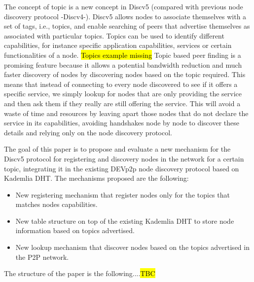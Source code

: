 The concept of topic is a new concept in Discv5 (compared with previous node discovery protocol -Discv4-).
Discv5 allows nodes to associate themselves with a set of tags, i.e., topics, and enable searching of peers that advertise themselves as associated with particular topics.  
Topics can be used to identify different  capabilities, for instance specific application capabilities,  services or certain functionalities of a node. 
\hl{Topics example missing}
Topic based peer finding is a promising feature because it allows a potential bandwidth reduction and much faster discovery of nodes
by  discovering nodes based on the topic required.
This means that instead of connecting to every node discovered to see if it offers a specific service,  we simply lookup for nodes that are only providing the service and then ask them if they really are still offering the service.
This will avoid a waste of time and resources by leaving apart those nodes that do not declare the service in its capabilities,  avoiding handshakes node by node to discover these details and relying only on the node discovery protocol. 



The goal of this paper is to propose and evaluate a new mechanism for the Discv5 protocol for registering and discovery nodes in the network for a certain topic,  integrating it in the existing DEVp2p node discovery protocol based on Kademlia DHT.  
The mechanisms proposed are the following:

\begin{itemize}
 \item New registering mechanism that register nodes only for the topics that matches nodes capabilities.
 \item New table structure on top of the existing Kademlia DHT to store node information based on topics advertised.
 \item New lookup mechanism that discover nodes based on the topics advertised in the P2P network.
\end{itemize}
    
The structure of the paper is the following....\hl{TBC}
